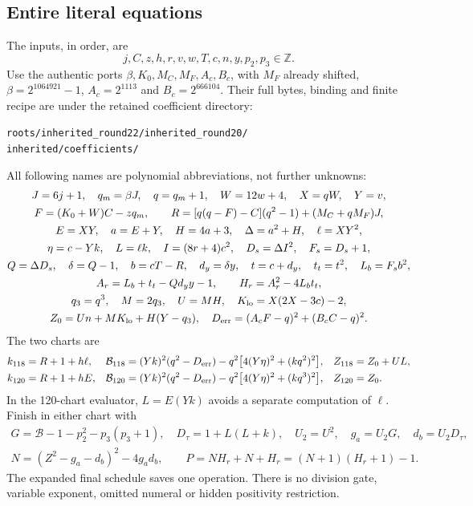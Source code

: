 \subsection{Entire literal equations}
The inputs, in order, are
\[
 j,C,z,h,r,v,w,T,c,n,y,p_2,p_3\in\mathbb Z.
\]
Use the authentic ports $\beta,K_0,M_C,M_F,A_c,B_c$, with $M_F$ already shifted,
$\beta=2^{1064921}-1$, $A_c=2^{1113}$ and $B_c=2^{666104}$. Their full bytes,
binding and finite recipe are under the retained coefficient directory:
\begin{center}\small\texttt{roots/inherited\_round22/inherited\_round20/}\\
\texttt{inherited/coefficients/}\end{center}
All following names are polynomial abbreviations, not further unknowns:
\begin{gather*}
 J=6j+1,\quad q_m=\beta J,\quad q=q_m+1,\quad W=12w+4,\quad X=qW,\quad Y=v,\\
 F=(K_0+W)C-zq_m,\qquad
 R=[q(q-F)-C](q^2-1)+(M_C+qM_F)J,\\
 E=XY,\quad a=E+Y,\quad H=4a+3,\quad \Delta=a^2+H,\quad \ell=XY^2,\\
 \eta=c-Yk,\quad L=\ell k,\quad I=(8r+4)c^2,\quad
 D_s=\Delta I^2,\quad F_s=D_s+1,\\
 Q=\Delta D_s,\quad \delta=Q-1,\quad b=cT-R,\quad d_y=\delta y,\quad
 t=c+d_y,\quad t_t=t^2,\quad L_b=F_sb^2,\\
 A_r=L_b+t_t-Qd_yy-1,\qquad H_r=A_r^2-4L_bt_t,\\
 q_3=q^3,\quad M=2q_3,\quad U=MH,\quad K_{\rm lo}=X(2X-3c)-2,\\
 Z_0=Un+MK_{\rm lo}+H(Y-q_3),\quad
 D_{\rm err}=(A_cF-q)^2+(B_cC-q)^2.
\end{gather*}
The two charts are
\begin{align*}
 k_{118}&=R+1+h\ell,&
 \mathcal B_{118}&=(Yk)^2(q^2-D_{\rm err})
             -q^2\bigl[4(Y\eta)^2+(kq^2)^2\bigr],&Z_{118}&=Z_0+UL,\\
 k_{120}&=R+1+hE,&
 \mathcal B_{120}&=(Yk)^2(q^2-D_{\rm err})
             -q^2\bigl[4(Y\eta)^2+(kq^3)^2\bigr],&Z_{120}&=Z_0.
\end{align*}
In the 120-chart evaluator, $L=E(Yk)$ avoids a separate computation of $\ell$.
Finish in either chart with
\begin{gather*}
 G=\mathcal B-1-p_2^2-p_3(p_3+1),\quad
 D_\tau=1+L(L+k),\quad U_2=U^2,\quad g_a=U_2G,\quad d_b=U_2D_\tau,\\
 N=(Z^2-g_a-d_b)^2-4g_ad_b,\qquad
 P=NH_r+N+H_r=(N+1)(H_r+1)-1.
\end{gather*}
The expanded final schedule saves one operation. There is no division gate,
variable exponent, omitted numeral or hidden positivity restriction.

